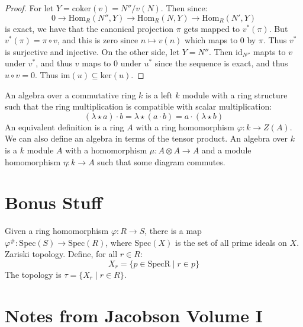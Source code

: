    \begin{proof}
        For let $Y=\textrm{coker}(v)=N''/v(N)$. Then since:
        \begin{equation}
            0\rightarrow\textrm{Hom}_{R}(N'',Y)
            \rightarrow\textrm{Hom}_{R}(N,Y)
            \rightarrow\textrm{Hom}_{R}(N',Y)
        \end{equation}
        is exact, we have that the canonical projection $\pi$ gets mapped
        to $v^{*}(\pi)$. But $v^{*}(\pi)=\pi\circ{v}$, and this is zero
        since $n\mapsto{v}(n)$ which maps to $0$ by $\pi$. Thus $v^{*}$ is
        surjective and injective. On the other side, let $Y=N''$. Then
        $\textrm{id}_{N''}$ mapts to $v$ under $v^{*}$, and thus
        $v$ maps to $0$ under $u^{*}$ since the sequence is exact, and
        thus $u\circ{v}=0$. Thus $\textrm{im}(u)\subseteq\textrm{ker}(u)$.
    \end{proof}
    An algebra over a commutative ring $k$ is a left $k$ module with a ring
    structure such that the ring multiplication is compatible with scalar
    multiplication:
    \begin{equation}
        (\lambda\star{a})\cdot{b}=\lambda\star(a\cdot{b})
            =a\cdot(\lambda\star{b})
    \end{equation}
    An equivalent definition is a ring $A$ with a ring homomorphism
    $\varphi:k\rightarrow{Z}(A)$. We can also define an algebra in terms of
    the tensor product. An algebra over $k$ is a $k$ module $A$ with a
    homomorphism $\mu:A\otimes{A}\rightarrow{A}$ and a module homomorphism
    $\eta:k\rightarrow{A}$ such that some diagram commutes.
\section{Bonus Stuff}
    Given a ring homomorphism $\varphi:R\rightarrow{S}$, there is a map
    $\varphi^{\#}:\textrm{Spec}(S)\rightarrow\textrm{Spec}(R)$, where
    $\textrm{Spec}(X)$ is the set of all prime ideals on $X$.
    Zariski topology. Define, for all $r\in{R}$:
    \begin{equation}
        X_{r}=\{p\in\textrm{Spec{R}}\;|\;r\in{p}\}
    \end{equation}
    The topology is $\tau=\{X_{r}\;|\;r\in{R}\}$.
\section{Notes from Jacobson Volume I}
